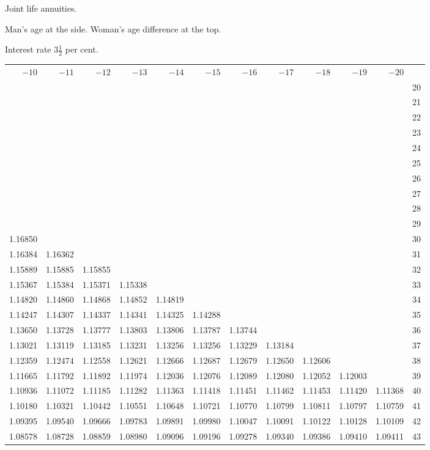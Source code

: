 \clearpage
{}
\begin{center}
Joint life annuities.\par\smallskip
Man's age at the side. Woman's age difference at the top.\par\smallskip
Interest rate \(3\tfrac{1}{2}\) per cent.\par\medskip
\fontsize{8}{10}\selectfont\setlength{\tabcolsep}{1.3pt}
\begin{tabular}{|rrrrrrrrrrr|r|}
\hline
\(-10\)&\(-11\)&\(-12\)&\(-13\)&\(-14\)&\(-15\)&\(-16\)&\(-17\)&\(-18\)&\(-19\)&\(-20\)&\\[8pt]
&&&&&&&&&&&20\\
&&&&&&&&&&&21\\
&&&&&&&&&&&22\\
&&&&&&&&&&&23\\
&&&&&&&&&&&24\\[5pt]
&&&&&&&&&&&25\\
&&&&&&&&&&&26\\
&&&&&&&&&&&27\\
&&&&&&&&&&&28\\
&&&&&&&&&&&29\\[5pt]
1.16850&&&&&&&&&&&30\\
1.16384&1.16362&&&&&&&&&&31\\
1.15889&1.15885&1.15855&&&&&&&&&32\\
1.15367&1.15384&1.15371&1.15338&&&&&&&&33\\
1.14820&1.14860&1.14868&1.14852&1.14819&&&&&&&34\\[5pt]
1.14247&1.14307&1.14337&1.14341&1.14325&1.14288&&&&&&35\\
1.13650&1.13728&1.13777&1.13803&1.13806&1.13787&1.13744&&&&&36\\
1.13021&1.13119&1.13185&1.13231&1.13256&1.13256&1.13229&1.13184&&&&37\\
1.12359&1.12474&1.12558&1.12621&1.12666&1.12687&1.12679&1.12650&1.12606&&&38\\
1.11665&1.11792&1.11892&1.11974&1.12036&1.12076&1.12089&1.12080&1.12052&1.12003&&39\\[5pt]
1.10936&1.11072&1.11185&1.11282&1.11363&1.11418&1.11451&1.11462&1.11453&1.11420&1.11368&40\\
1.10180&1.10321&1.10442&1.10551&1.10648&1.10721&1.10770&1.10799&1.10811&1.10797&1.10759&41\\
1.09395&1.09540&1.09666&1.09783&1.09891&1.09980&1.10047&1.10091&1.10122&1.10128&1.10109&42\\
1.08578&1.08728&1.08859&1.08980&1.09096&1.09196&1.09278&1.09340&1.09386&1.09410&1.09411&43\\

\end{tabular}
\end{center}
